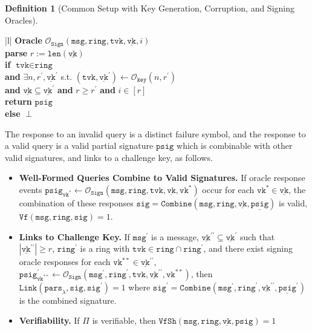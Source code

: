 \documentclass[11pt]{article}
\theoremstyle{definition}
\newtheorem{definition}[definition]{Definition}
\newcommand{\vk}{\texttt{vk}}
\newcommand{\tvk}{\texttt{tvk}}
\newcommand{\ring}{\texttt{ring}}
\newcommand{\VK}{\underline{\texttt{vk}}}
\newcommand{\sig}{\texttt{sig}}
\newcommand{\psig}{\texttt{psig}}
\newcommand{\secpar}{\lambda}
\newcommand{\params}{\texttt{pars}}
\newcommand{\msg}{\texttt{msg}}
\newcommand{\sign}{\texttt{Sign}}
\newcommand{\combine}{\texttt{Combine}}
\newcommand{\PSIG}{\underline{\psig}}
\newcommand{\verify}{\texttt{Vf}}
\newcommand{\link}{\texttt{Link}}
\newcommand{\verifyshare}{\texttt{VfSh}}
\newcommand{\signingOracle}{\mathcal{O}_{\sign}}
\newcommand{\keyOracle}{\mathcal{O}_{\texttt{key}}}
\begin{document}
\begin{definition}[Common Setup with Key Generation, Corruption, and Signing Oracles]
\begin{enumerate}
\begin{enumerate}
\begin{oracle}
    \centering
        \begin{tabular}{|l|}
        \hline
          {\textbf{Oracle} $\signingOracle(\msg, \ring, \tvk, \VK, i)$} \\
        \hline 
        \textbf{parse} $r:=\texttt{len}(\VK)$ \\
        \textbf{if} $\tvk \in \ring$ \\ 
        \textbf{and} $\exists n,r^\prime,\VK^\prime$ s.t. $(\tvk, \VK^\prime) \leftarrow \keyOracle(n,r^\prime)$ \\ 
        \textbf{and} $\VK \subseteq \VK^\prime$ \textbf{and} $r \geq r^\prime$ \textbf{ and } $i \in [r]$ \\
        \quad \quad \textbf{return} $\psig$ \\
        \textbf{else} $\perp$ \\
        \hline
        \end{tabular}
\caption{The signing oracle}
\label{oracle:sign}
\end{oracle}

The response to an invalid query is a distinct failure symbol, and the response to a valid query is a valid partial signature $\psig$ which is combinable with other valid signatures, and links to a challenge key, as follows.
\begin{itemize}
\item \textbf{Well-Formed Queries Combine to Valid Signatures.} 
If oracle response events
$\psig_{\vk^*} \leftarrow \signingOracle(\msg, \ring, \tvk, \VK, \vk^*)$ occur for each  $\vk^* \in \VK$, the combination of these responses
$\sig = \combine(\msg, \ring, \VK, \PSIG)$ is valid, $\verify(\msg, \ring, \sig)=1$. 

\item \textbf{Links to Challenge Key.}
If $\msg^\prime$ is a message, $\VK^{\prime \prime} \subseteq \VK^\prime$ such that $\left|\VK^{\prime \prime}\right| \geq r$, $\ring^\prime$ is a ring with $\tvk \in \ring \cap \ring^\prime$, and there exist signing oracle responses for each $\vk^{**} \in \VK^{\prime \prime}$, $\psig^\prime_{\vk^{**}} \leftarrow \signingOracle(\msg^\prime, \ring^\prime, \tvk, \VK^{\prime \prime}, \vk^{**})$, then $\link(\params_\secpar, \sig, \sig^\prime)=1$ where $\sig^\prime = \combine(\msg^\prime, \ring^\prime, \VK^{\prime \prime}, \PSIG^\prime)$ is the combined signature.
\item \textbf{Verifiability.} If $\Pi$ is verifiable, then $\verifyshare(\msg, \ring, \VK, \psig)=1$
\end{itemize}




\end{enumerate}
\end{enumerate}
\end{definition}
\end{document}
